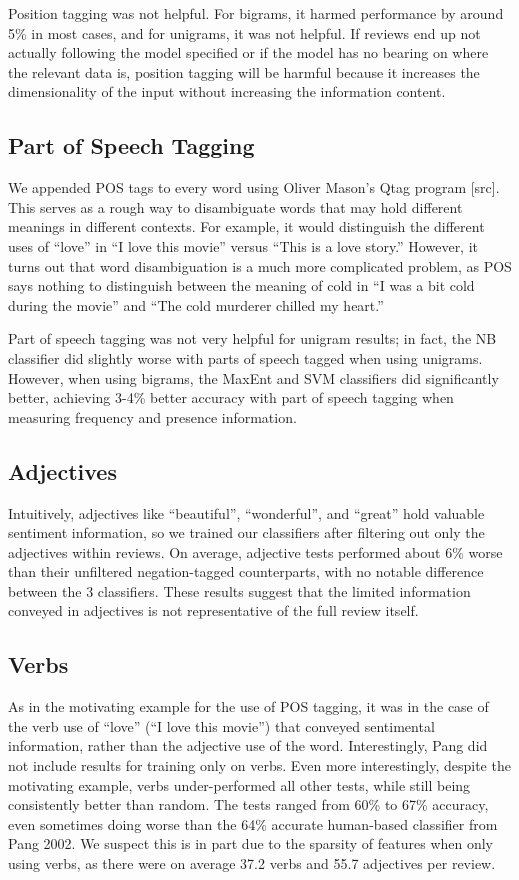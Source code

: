 \documentclass[10pt,twocolumn,letterpaper]{article}
\begin{document}
Position tagging was not helpful. For bigrams, it harmed performance by around 5\% in most cases, and for unigrams, it was not helpful. If reviews end up not actually following the model specified or if the model has no bearing on where the relevant data is, position tagging will be harmful because it increases the dimensionality of the input without increasing the information content.

\subsection{Part of Speech Tagging}
We appended POS tags to every word using Oliver Mason’s Qtag program [src]. This serves as a rough way to disambiguate words that may hold different meanings in different contexts. For example, it would distinguish the different uses of “love” in ``I love this movie'' versus ``This is a love story.'' However, it turns out that word disambiguation is a much more complicated problem, as POS says nothing to distinguish between the meaning of cold in ``I was a bit cold during the movie'' and ``The cold murderer chilled my heart.''

Part of speech tagging was not very helpful for unigram results; in fact, the NB classifier did slightly worse with parts of speech tagged when using unigrams. However, when using bigrams, the MaxEnt and SVM classifiers did significantly better, achieving 3-4\% better accuracy with part of speech tagging when measuring frequency and presence information.

\subsection{Adjectives}
Intuitively, adjectives like ``beautiful'', ``wonderful'', and ``great'' hold valuable sentiment information, so we trained our classifiers after filtering out only the adjectives within reviews. On average, adjective tests performed about 6\% worse than their unfiltered negation-tagged counterparts, with no notable difference between the 3 classifiers. These results suggest that the limited information conveyed in adjectives is not representative of the full review itself.


\subsection{Verbs}
As in the motivating example for the use of POS tagging, it was in the case of the verb use of ``love'' (``I love this movie'') that conveyed sentimental information, rather than the adjective use of the word. Interestingly, Pang did not include results for training only on verbs. Even more interestingly, despite the motivating example, verbs under-performed all other tests, while still being consistently better than random. The tests ranged from 60\% to 67\% accuracy, even sometimes doing worse than the 64\% accurate human-based classifier from Pang 2002. We suspect this is in part due to the sparsity of features when only using verbs, as there were on average 37.2 verbs and 55.7 adjectives per review.
\end{document}
